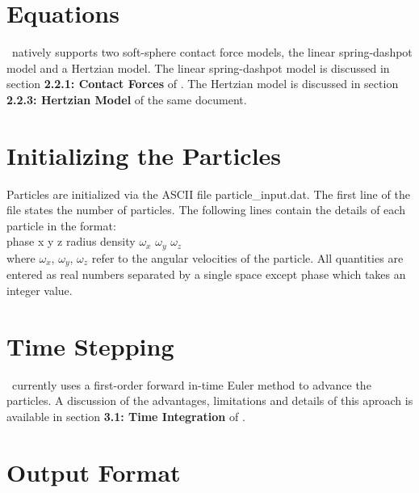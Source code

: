 \section{Equations}

\mfix\ natively supports two soft-sphere contact force models, the linear 
spring-dashpot model and a Hertzian model. The linear spring-dashpot
model is discussed in section {\bf 2.2.1: Contact Forces} of \demdoc. The 
Hertzian model is discussed in section {\bf 2.2.3: Hertzian Model} of the same
document. 


\section{Initializing the Particles}

Particles are initialized via the ASCII file {\sf particle\_input.dat}. The 
first line of the file states the number of particles. The following lines 
contain the details of each particle in the format: \\

{\sf phase x y z radius density $\omega_x$ $\omega_y$ $\omega_z$}  \\

\noindent
where {\sf $\omega_x$, $\omega_y$, $\omega_z$} refer to the angular velocities
 of the particle. All quantities are entered as real numbers separated by a 
single space except {\sf phase} which takes an integer value.   


%


	
\section{Time Stepping}

\mfix\ currently uses a first-order forward in-time Euler method to advance 
the particles. A discussion of the advantages, limitations and details of this 
aproach is available in section {\bf 3.1: Time Integration} of \demdoc. 

\section{Output Format}

